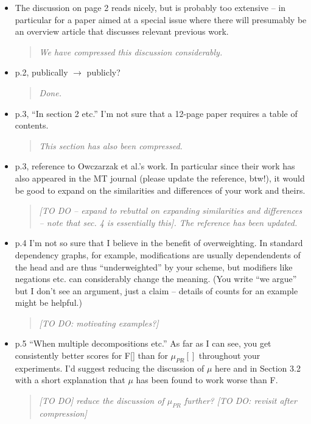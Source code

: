 \documentclass[letterpaper,12pt]{article}
\newenvironment{response}
{\begin{quotation} \it}
  {\end{quotation}}
\begin{document}
\begin{itemize}
\item The discussion on page 2 reads nicely, but is probably too
  extensive -- in particular for a paper aimed at a special issue
  where there will presumably be an overview article that discusses
  relevant previous work.
  \begin{response}
    We have compressed this discussion considerably.
  \end{response}

\item  p.2, publically $\to$ publicly?
  \begin{response}
    Done.
  \end{response}

\item  p.3, ``In section 2 etc.'' I'm not sure that a 12-page paper
  requires a table of contents.
  \begin{response}
    This section has also been compressed.
  \end{response}

\item  p.3, reference to Owczarzak et al.'s work. In particular since
  their work has also appeared in the MT journal (please update the
  reference, btw!), it would be good to expand on the similarities and
  differences of your work and theirs.
  \begin{response}
    [TO DO -- expand to rebuttal on expanding similarities and
    differences -- note that sec. 4 is essentially this].  The
    reference has been updated.
  \end{response}

\item p.4 I'm not so sure that I believe in the benefit of overweighting.
  In standard dependency graphs, for example, modifications are
  usually dependendents of the head and are thus ``underweighted'' by
  your scheme, but modifiers like negations etc. can considerably
  change the meaning.  (You write ``we argue'' but I don't see an
  argument, just a claim -- details of counts for an example might be
  helpful.)
  \begin{response}
    [TO DO: motivating examples?]
  \end{response}

\item p.5 ``When multiple decompositions etc.'' As far as I can see, you
  get consistently better scores for F[] than for $\mu_{PR}[]$
  throughout your experiments.  I'd suggest reducing the discussion of
  $\mu$ here and in Section 3.2 with a short explanation that $\mu$
  has been found to work worse than F.
  \begin{response}
    [TO DO] reduce the discussion of $\mu_{PR}$ further? [TO DO:
    revisit after compression]
  \end{response}


\end{itemize}
\end{document}
